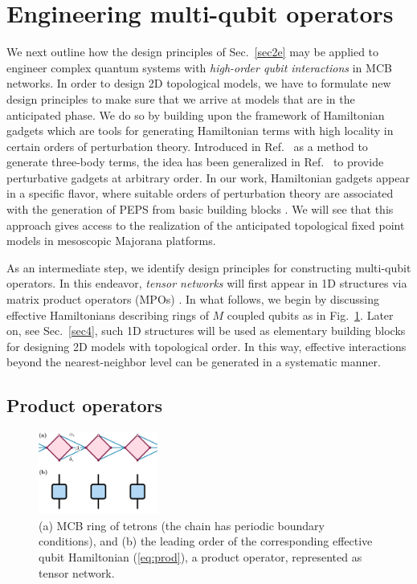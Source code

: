 \documentclass[twocolumn,floats,prx,showpacs]{revtex4-1}
\newcommand{\rein}[1]{{\color{rein} #1}}
\begin{document}
\section{Engineering multi-qubit operators}\label{sec3}

We next outline  how the  design principles of Sec.~\ref{sec2e} may be applied to engineer complex quantum systems with \emph{high-order qubit interactions} in MCB networks. 
In order to design 2D topological models, we have to formulate new
design principles to make sure that we arrive at models that are in the anticipated phase. We do so by building upon the 
framework of Hamiltonian gadgets 
\cite{Kempe-SIAM-2006,PhysRevA.77.062329,Brell2014PEPS,Bartlett06} \rein{which
are tools for generating Hamiltonian terms with high locality in certain orders of perturbation theory. Introduced
in Ref.~\cite{Kempe-SIAM-2006} as a method to generate three-body terms, the idea has been generalized in 
Ref.~\cite{PhysRevA.77.062329} to provide perturbative gadgets at arbitrary order. In our work, Hamiltonian gadgets appear in a 
specific flavor, where suitable orders of perturbation theory are associated with the  generation of PEPS from basic building blocks
\cite{Brell2014PEPS,Bartlett06}. We will see that this approach gives access to the realization of
the anticipated topological fixed point models in mesoscopic Majorana platforms.}

As an intermediate step, we identify design principles for constructing multi-qubit operators. \rein{In this endeavor, \emph{tensor networks} \cite{Orus-AnnPhys-2014,AreaReview,VerstraeteBig,SchuchReview}
will first appear in 1D structures via matrix product operators (MPOs)
\cite{Mixed,1367-2630-12-2-025012,raey,MPO_Representations,UndecidableMPO,Bultinck2017}.
In what follows, we begin by discussing effective Hamiltonians describing  rings of $M$ coupled qubits as in Fig.~\ref{fig:tetron_prod}.  Later on, see Sec.~\ref{sec4}, such 1D structures will be used as elementary building blocks for designing 2D models with topological order. In this way,  effective interactions beyond the nearest-neighbor level can be generated in a systematic manner.  }

\subsection{Product operators}\label{sec3a}

\begin{figure}
\includegraphics[width=0.35\textwidth]{fig/tetron_prod.pdf}
\caption{(a) MCB ring of tetrons (the chain has periodic boundary conditions), and (b) the leading order of the corresponding effective qubit Hamiltonian (\ref{eq:prod}), a product operator, represented as tensor network.}
\label{fig:tetron_prod}
\end{figure}
\end{document}
